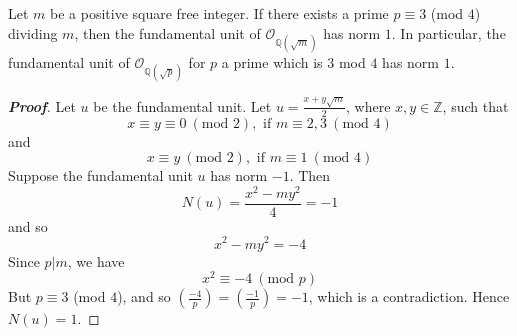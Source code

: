\begin{theorem} Let $m$ be a positive square free integer. If there exists a prime $p \equiv 3$ (mod $4$) dividing $m$, then the fundamental unit of $\mathcal{O}_{\mathbb{Q}(\sqrt{m})}$ has norm $1$. In particular, the fundamental unit of $\mathcal{O}_{\mathbb{Q}(\sqrt{p})}$ for $p$ a prime which is $3$ mod $4$ has norm $1$.
\end{theorem}
\begin{proof}[\bf Proof] Let $u$ be the fundamental unit. Let $u=\frac{x+y\sqrt{m}}{2}$, where $x,y \in \mathbb{Z}$, such that
$$x \equiv y \equiv 0~(\text{mod }2), \text{ if } m \equiv 2,3~(\text{mod } 4)$$
and
$$x \equiv y~(\text{mod }2), \text{ if } m \equiv 1~(\text{mod } 4)$$
Suppose the fundamental unit $u$ has norm $-1$. Then
$$N(u)=\frac{x^2-my^2}{4}=-1$$
and so $$x^2-my^2=-4$$
Since $p|m$, we have
$$x^2 \equiv -4~(\text{mod } p)$$
But $p \equiv 3$ (mod $4$), and so $(\frac{-4}{p})=(\frac{-1}{p})=-1$, which is a contradiction.
Hence $N(u)=1$.
\end{proof}


